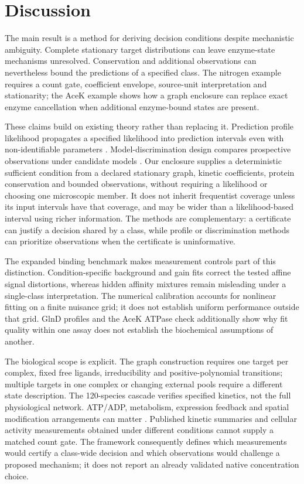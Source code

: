 \documentclass[10pt,letterpaper]{article}
\begin{document}
\section*{Discussion}

The main result is a method for deriving decision conditions despite mechanistic ambiguity. Complete stationary target distributions can leave enzyme-state mechanisms unresolved. Conservation and additional observations can nevertheless bound the predictions of a specified class. The nitrogen example requires a count gate, coefficient envelope, source-unit interpretation and stationarity; the AceK example shows how a graph enclosure can replace exact enzyme cancellation when additional enzyme-bound states are present.

These claims build on existing theory rather than replacing it. Prediction profile likelihood propagates a specified likelihood into prediction intervals even with non-identifiable parameters \cite{r82}. Model-discrimination design compares prospective observations under candidate models \cite{r70}. Our enclosure supplies a deterministic sufficient condition from a declared stationary graph, kinetic coefficients, protein conservation and bounded observations, without requiring a likelihood or choosing one microscopic member. It does not inherit frequentist coverage unless its input intervals have that coverage, and may be wider than a likelihood-based interval using richer information. The methods are complementary: a certificate can justify a decision shared by a class, while profile or discrimination methods can prioritize observations when the certificate is uninformative.

The expanded binding benchmark makes measurement controls part of this distinction. Condition-specific background and gain fits correct the tested affine signal distortions, whereas hidden affinity mixtures remain misleading under a single-class interpretation. The numerical calibration accounts for nonlinear fitting on a finite nuisance grid; it does not establish uniform performance outside that grid. GlnD profiles and the AceK ATPase check additionally show why fit quality within one assay does not establish the biochemical assumptions of another.

The biological scope is explicit. The graph construction requires one target per complex, fixed free ligands, irreducibility and positive-polynomial transitions; multiple targets in one complex or changing external pools require a different state description. The 120-species cascade verifies specified kinetics, not the full physiological network. ATP/ADP, metabolism, expression feedback and spatial modification arrangements can matter \cite{r41,r75}. Published kinetic summaries and cellular activity measurements obtained under different conditions cannot supply a matched count gate. The framework consequently defines which measurements would certify a class-wide decision and which observations would challenge a proposed mechanism; it does not report an already validated native concentration choice.
\end{document}
